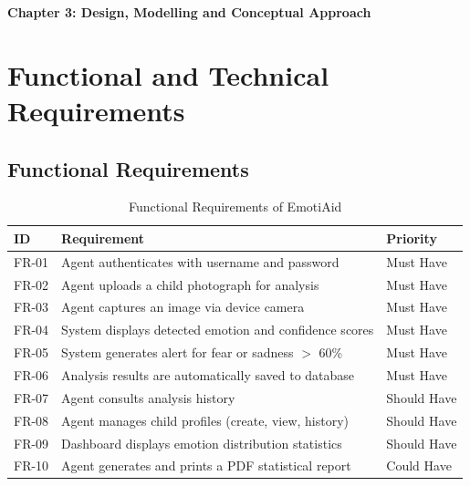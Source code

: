 \documentclass[a4paper,12pt,oneside]{report}
\begin{document}
\newpage
\thispagestyle{fancy}
{\LARGE \bfseries \noindent Chapter 3: Design, Modelling and Conceptual Approach}
\vspace{2em}
\renewcommand{\thesection}{\Roman{section}}
\justifying

\section{Functional and Technical Requirements}

\subsection{Functional Requirements}

\begin{table}[H]
\centering
\caption{Functional Requirements of EmotiAid}
\begin{tabular}{|l|p{7cm}|l|}
\hline
\textbf{ID} & \textbf{Requirement} & \textbf{Priority} \\
\hline
FR-01 & Agent authenticates with username and password & Must Have \\
\hline
FR-02 & Agent uploads a child photograph for analysis & Must Have \\
\hline
FR-03 & Agent captures an image via device camera & Must Have \\
\hline
FR-04 & System displays detected emotion and confidence scores & Must Have \\
\hline
FR-05 & System generates alert for fear or sadness $>$ 60\% & Must Have \\
\hline
FR-06 & Analysis results are automatically saved to database & Must Have \\
\hline
FR-07 & Agent consults analysis history & Should Have \\
\hline
FR-08 & Agent manages child profiles (create, view, history) & Should Have \\
\hline
FR-09 & Dashboard displays emotion distribution statistics & Should Have \\
\hline
FR-10 & Agent generates and prints a PDF statistical report & Could Have \\
\hline
\end{tabular}
\label{tab:requirements}
\end{table}
\end{document}
